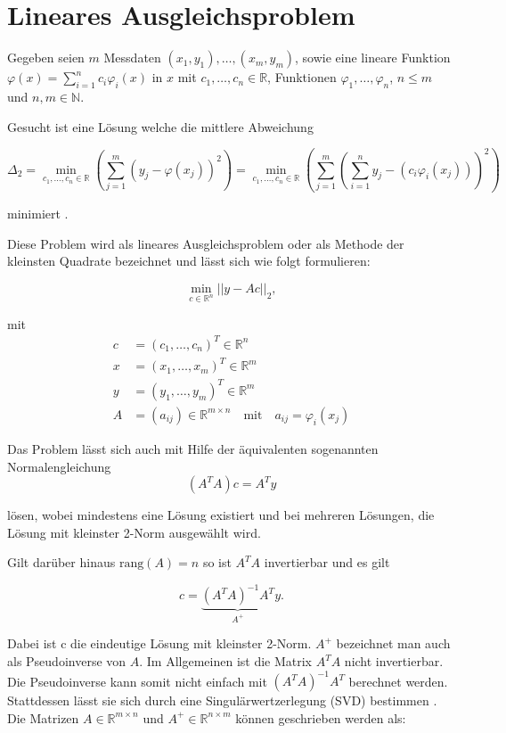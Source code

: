\section{Lineares Ausgleichsproblem}
\label{s:LSQ}
Gegeben seien $m$ Messdaten $(x_1,y_1),\dotsc,(x_m,y_m)$, sowie eine lineare Funktion $\varphi(x) = \sum_{i = 1}^{n}c_i\varphi_i(x)$ in $x$ mit $c_1,\dotsc,c_n\in\mathbb{R}$, Funktionen $\varphi_1,\dotsc,\varphi_n$, $n\leq m$ und $n,m\in\mathbb{N}$. 

Gesucht ist eine Lösung welche die mittlere Abweichung

\[
\Delta_2 = \min_{c_1,\dotsc,c_n\in\mathbb{R}} \left(\sum_{j=1}^{m}\left(y_j - \varphi(x_j)\right)^2\right) = \min_{c_1,\dotsc,c_n\in\mathbb{R}} \left(\sum_{j=1}^{m}\left(\sum_{i=1}^{n}y_j-\left(c_i\varphi_i(x_j)\right)\right)^2\right)
\]

minimiert \cite{Stoer2007}.

Diese Problem wird als lineares Ausgleichsproblem oder als Methode der kleinsten Quadrate bezeichnet und lässt sich wie folgt formulieren:

\[
\min_{c\in\mathbb{R}^n} ||y - Ac||_2,
\]

mit 
\[
\begin{aligned}
c &= (c_1,\dotsc,c_n)^T\in\mathbb{R}^n \\
x &= (x_1,\dotsc,x_m)^T\in\mathbb{R}^m \\
y &= (y_1,\dotsc,y_m)^T\in\mathbb{R}^m \\
A &= (a_{ij})\in\mathbb{R}^{m\times n}\quad\text{mit}\quad a_{ij} = \varphi_i(x_j)
\end{aligned}
\]

Das Problem lässt sich auch mit Hilfe der äquivalenten sogenannten Normalengleichung
\begin{equation*}
	(A^TA)c = A^Ty
\end{equation*}

lösen, wobei mindestens eine Lösung existiert und bei mehreren Lösungen, die Lösung mit kleinster 2-Norm ausgewählt wird. 

Gilt darüber hinaus $\text{rang}\left(A\right) = n$ so ist $A^TA$ invertierbar und es gilt 

\begin{equation}\label{eq:normaleq}
c = \underbrace{(A^TA)^{-1}A^T}_{A^+}y.
\end{equation}

Dabei ist c die eindeutige Lösung mit kleinster 2-Norm. $A^+$ bezeichnet man auch als Pseudoinverse von $A$. Im Allgemeinen ist die Matrix $A^TA$ nicht invertierbar. Die Pseudoinverse kann somit nicht einfach mit $(A^TA)^{-1}A^T$ berechnet werden. Stattdessen lässt sie sich durch eine Singulärwertzerlegung (SVD) bestimmen \cite{Stoer2011}. Die Matrizen $A\in\mathbb{R}^{m\times n}$ und $A^+\in\mathbb{R}^{n\times m}$ können geschrieben werden als:

